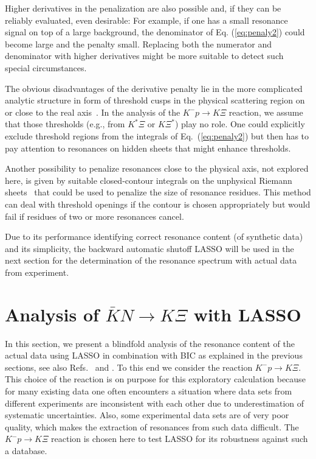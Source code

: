 \documentclass[10pt,aps,prc,superscriptaddress,twoside,twocolumn,nofootinbib,showpacs,preprintnumbers]{revtex4-1}
\begin{document}
Higher derivatives in the penalization are also possible and, if they can be reliably evaluated, even desirable: For example, if one has a small resonance signal on top of a large background,  the denominator of Eq. (\ref{eq:penaly2}) could become large and the penalty small. Replacing both the numerator and denominator with higher derivatives might be more suitable to detect such special circumstances.

The obvious disadvantages of the derivative penalty lie in the more complicated analytic structure in form of threshold cusps  in the physical scattering region on or close to the real axis~\cite{Ceci:2011ae}. In the analysis of the $K^-p\to K\Xi$ reaction, we assume that those thresholds (e.g., from $K^*\Xi$ or $K\Xi^*$) play no role. One could explicitly exclude threshold regions from the integrals of Eq.~(\ref{eq:penaly2}) but then has to pay attention to resonances on hidden sheets that might enhance thresholds.

Another possibility to penalize resonances close to the physical axis, not explored here, is given by suitable closed-contour integrals on the unphysical Riemann sheets~\cite{Doring:2009yv} that could be used to penalize the size of resonance residues. This method can deal with threshold openings if the contour is chosen appropriately but would fail if residues of two or more resonances cancel. 

Due to its performance identifying correct resonance content (of synthetic data) and its simplicity, the backward automatic shutoff LASSO will be used in the next section for the determination of the resonance spectrum with actual data from experiment.

\section{\boldmath Analysis of $\bar{K} N \to K\Xi$ with LASSO}
\label{sec:real-data}


In this section, we present a blindfold analysis of the resonance content of the actual data using LASSO in combination with BIC as explained in the previous sections, see also Refs.~\cite{TS96,hastie_hastie_tibshirani_friedman_2001,james2013an} and \cite{S78}. To this end we consider the reaction $K^-p\to K \Xi$. This choice of the reaction is on purpose for this exploratory calculation because for many existing data one often encounters a situation where data sets from different experiments are inconsistent with each other due to underestimation of systematic uncertainties. Also, some experimental data sets are of very poor quality, which makes the extraction of resonances from such data difficult. The $K^-p\to K\Xi$ reaction is chosen here to test LASSO for its robustness against such a database. 
\end{document}
